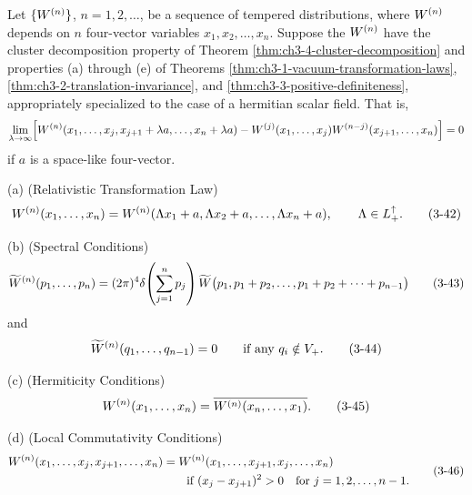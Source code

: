 \begin{theorem}[3-7]\label{thm:ch3-reconstruction}
Let \(\{W^{(n)}\}\), \(n=1,2,\ldots\), be a sequence of tempered
distributions, where \(W^{(n)}\) depends on \(n\) four-vector
variables \(x_1,x_2,\ldots,x_n\).  Suppose the \(W^{(n)}\) have the
cluster decomposition property of Theorem \ref{thm:ch3-4-cluster-decomposition} and properties (a) through (e)
of Theorems \ref{thm:ch3-1-vacuum-transformation-laws}, \ref{thm:ch3-2-translation-invariance}, and \ref{thm:ch3-3-positive-definiteness}, appropriately specialized to the case of a
hermitian scalar field.  That is,
\begin{equation*}
\lim_{\lambda\to\infty}\Bigl[
  W^{(n)}(x_1,\ldots,x_j,x_{j+1}+\lambda a,\ldots,x_n+\lambda a)
  -W^{(j)}(x_1,\ldots,x_j)
   W^{(n-j)}(x_{j+1},\ldots,x_n)
\Bigr]=0
\end{equation*}
if \(a\) is a space-like four-vector.

\textup{(a) (Relativistic Transformation Law)}
\begin{equation}
W^{(n)}(x_1,\ldots,x_n)
 =W^{(n)}(\Lambda x_1+a,\Lambda x_2+a,\ldots,\Lambda x_n+a),
 \qquad \Lambda\in L_+^\uparrow .
\tag{3-42}\label{eq:ch3-reconstruction-relativistic}
\end{equation}

\textup{(b) (Spectral Conditions)}
\begin{equation}
\widetilde{W}^{(n)}(p_1,\ldots,p_n)
 =(2\pi)^4\delta\!\left(\sum_{j=1}^{n}p_j\right)
 \widetilde{W}\bigl(p_1,p_1+p_2,\ldots,
 p_1+p_2+\cdots+p_{n-1}\bigr)
\tag{3-43}\label{eq:ch3-reconstruction-spectral-delta}
\end{equation}
and
\begin{equation}
\widetilde{W}^{(n)}(q_1,\ldots,q_{n-1})=0
\qquad\text{if any }q_i\notin V_+ .
\tag{3-44}\label{eq:ch3-reconstruction-spectral-support}
\end{equation}

\textup{(c) (Hermiticity Conditions)}
\begin{equation}
W^{(n)}(x_1,\ldots,x_n)
 =\overline{W^{(n)}(x_n,\ldots,x_1)} .
\tag{3-45}\label{eq:ch3-reconstruction-hermiticity}
\end{equation}

\textup{(d) (Local Commutativity Conditions)}
\begin{equation}
\begin{aligned}
W^{(n)}(x_1,\ldots,x_j,x_{j+1},\ldots,x_n)
 &=W^{(n)}(x_1,\ldots,x_{j+1},x_j,\ldots,x_n) \\
 &\hspace{2em}\text{if }(x_j-x_{j+1})^2>0
 \quad\text{for }j=1,2,\ldots,n-1 .
\end{aligned}
\tag{3-46}\label{eq:ch3-reconstruction-locality}
\end{equation}


\end{theorem}
